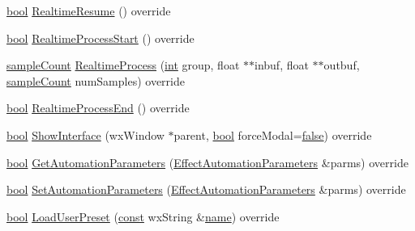 \begin{DoxyCompactItemize}
\item 
\hyperlink{mac_2config_2i386_2lib-src_2libsoxr_2soxr-config_8h_abb452686968e48b67397da5f97445f5b}{bool} \hyperlink{class_ladspa_effect_aafe107f4ac2dbebbd91546a63213df95}{Realtime\+Resume} () override
\item 
\hyperlink{mac_2config_2i386_2lib-src_2libsoxr_2soxr-config_8h_abb452686968e48b67397da5f97445f5b}{bool} \hyperlink{class_ladspa_effect_a012a2a33ee1a1c741abb48292f4478f6}{Realtime\+Process\+Start} () override
\item 
\hyperlink{include_2audacity_2_types_8h_afa427e1f521ea5ec12d054e8bd4d0f71}{sample\+Count} \hyperlink{class_ladspa_effect_a60b5c87e8dfab482847c1f599316fc02}{Realtime\+Process} (\hyperlink{xmltok_8h_a5a0d4a5641ce434f1d23533f2b2e6653}{int} group, float $\ast$$\ast$inbuf, float $\ast$$\ast$outbuf, \hyperlink{include_2audacity_2_types_8h_afa427e1f521ea5ec12d054e8bd4d0f71}{sample\+Count} num\+Samples) override
\item 
\hyperlink{mac_2config_2i386_2lib-src_2libsoxr_2soxr-config_8h_abb452686968e48b67397da5f97445f5b}{bool} \hyperlink{class_ladspa_effect_a11ce8e562e0b1205dec9b2d1225f8722}{Realtime\+Process\+End} () override
\item 
\hyperlink{mac_2config_2i386_2lib-src_2libsoxr_2soxr-config_8h_abb452686968e48b67397da5f97445f5b}{bool} \hyperlink{class_ladspa_effect_a1a84e2823207c460811bbd7eff879136}{Show\+Interface} (wx\+Window $\ast$parent, \hyperlink{mac_2config_2i386_2lib-src_2libsoxr_2soxr-config_8h_abb452686968e48b67397da5f97445f5b}{bool} force\+Modal=\hyperlink{mac_2config_2i386_2lib-src_2libsoxr_2soxr-config_8h_a65e9886d74aaee76545e83dd09011727}{false}) override
\item 
\hyperlink{mac_2config_2i386_2lib-src_2libsoxr_2soxr-config_8h_abb452686968e48b67397da5f97445f5b}{bool} \hyperlink{class_ladspa_effect_ab2982becf12b49d7c8e15d8b009a0f9f}{Get\+Automation\+Parameters} (\hyperlink{class_effect_automation_parameters}{Effect\+Automation\+Parameters} \&parms) override
\item 
\hyperlink{mac_2config_2i386_2lib-src_2libsoxr_2soxr-config_8h_abb452686968e48b67397da5f97445f5b}{bool} \hyperlink{class_ladspa_effect_a52030daabaf9aed051d3a6aefd9d855f}{Set\+Automation\+Parameters} (\hyperlink{class_effect_automation_parameters}{Effect\+Automation\+Parameters} \&parms) override
\item 
\hyperlink{mac_2config_2i386_2lib-src_2libsoxr_2soxr-config_8h_abb452686968e48b67397da5f97445f5b}{bool} \hyperlink{class_ladspa_effect_a13d44ff01285ea4aa069a9bb53c09ac6}{Load\+User\+Preset} (\hyperlink{getopt1_8c_a2c212835823e3c54a8ab6d95c652660e}{const} wx\+String \&\hyperlink{lib_2expat_8h_a1b49b495b59f9e73205b69ad1a2965b0}{name}) override

\end{DoxyCompactItemize}
